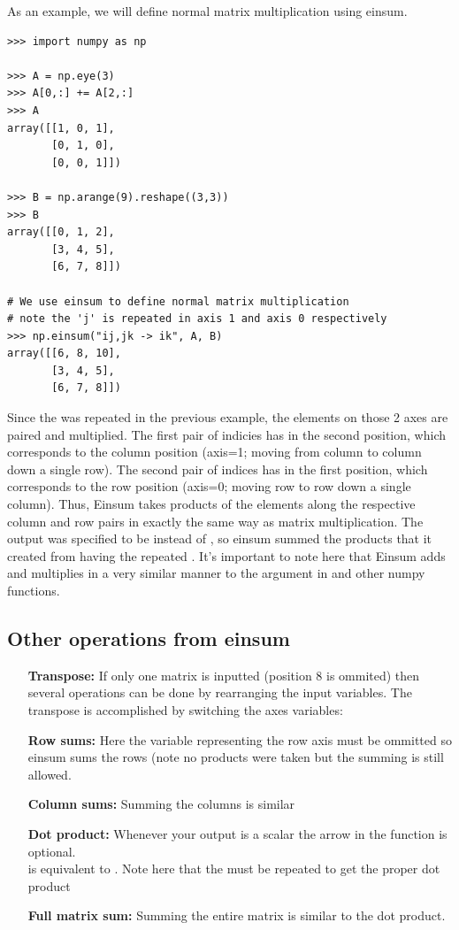\noindent As an example, we will define normal matrix multiplication using einsum.

\begin{lstlisting}
>>> import numpy as np

>>> A = np.eye(3)
>>> A[0,:] += A[2,:]
>>> A
array([[1, 0, 1],
       [0, 1, 0],
       [0, 0, 1]])

>>> B = np.arange(9).reshape((3,3))
>>> B
array([[0, 1, 2],
       [3, 4, 5],
       [6, 7, 8]])

# We use einsum to define normal matrix multiplication
# note the 'j' is repeated in axis 1 and axis 0 respectively
>>> np.einsum("ij,jk -> ik", A, B) 
array([[6, 8, 10],
       [3, 4, 5],
       [6, 7, 8]])

\end{lstlisting}

Since the  was repeated in the previous example, the elements on those 2 axes are paired and multiplied. The first pair of indicies has  in the second position, which corresponds to the column position (axis=1; moving from column to column down a single row). The second pair of indices has  in the first position, which corresponds to the row position (axis=0; moving row to row down a single column). Thus, Einsum takes products of the elements along the respective column and row pairs in exactly the same way as matrix multiplication.
The output was specified to be  instead of , so einsum summed the products that it created from having the repeated .
It's important to note here that Einsum adds and multiplies in a very similar manner to the  argument in  and other numpy functions.

\subsection*{Other operations from einsum}

\begin{enumerate}
\item[\textbf{Transpose:}] If only one matrix is inputted (position 8 is ommited) then several operations can be done by rearranging the input variables. The transpose is accomplished by switching the axes variables: 
\item[\textbf{Row sums:}] Here the variable representing the row axis must be ommitted so einsum sums the rows (note no products were taken but the summing is still allowed. 
\item[\textbf{Column sums:}] Summing the columns is similar 
\item[\textbf{Dot product:}] Whenever your output is a scalar the arrow in the function is optional.\\  is equivalent to . Note here that the  must be repeated to get the proper dot product
\item[\textbf{Full matrix sum:}] Summing the entire matrix is similar to the dot product.  
 
\end{enumerate}

